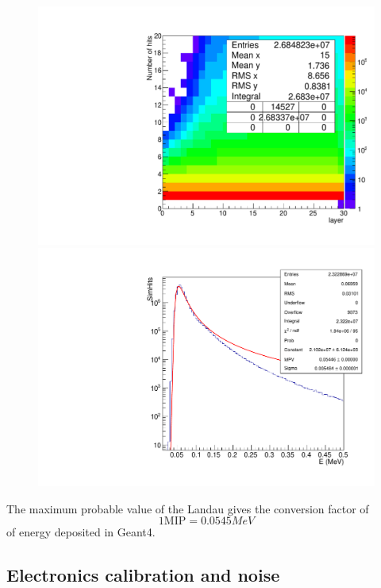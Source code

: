 \begin{figure}[h!]
  \begin{center}
    \includegraphics[width=\cmsFigWidth]{figures/mipHits.pdf}
    \includegraphics[width=\cmsFigWidth]{figures/mipDepositSel.pdf}
    \caption{}
    \label{fig:muHits}
  \end{center}
\end{figure}

The maximum probable value of the Landau gives the conversion factor
of $$1 \mathrm{MIP} = 0.0545 MeV$$ of energy deposited in Geant4.

\subsection{Electronics calibration and noise}

